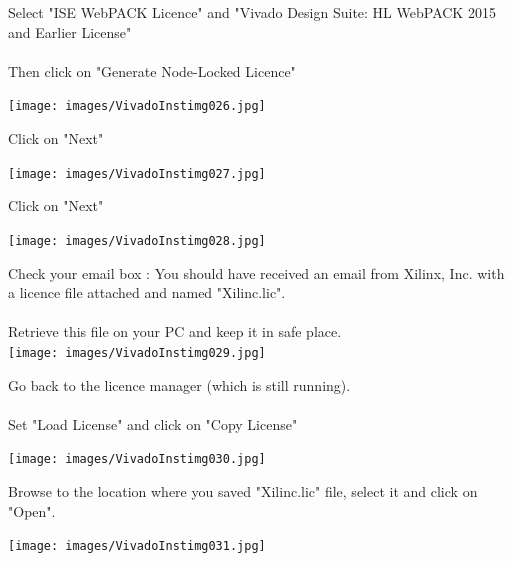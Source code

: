 \begin{minipage}{\linewidth}
Select "ISE WebPACK Licence" and "Vivado Design Suite: HL WebPACK 2015 and Earlier License" \\
\\
Then click on "Generate Node-Locked Licence"
\\
\begin{center}
  \texttt{[image: images/VivadoInstimg026.jpg]}
\end{center}
\end{minipage}

\begin{minipage}{\linewidth}
  Click on "Next"
  \\
  \begin{center}
    \texttt{[image: images/VivadoInstimg027.jpg]}
  \end{center}
\end{minipage}

\begin{minipage}{\linewidth}
  Click on "Next"
  \\
  \begin{center}
    \texttt{[image: images/VivadoInstimg028.jpg]}
  \end{center}
\end{minipage}


\begin{minipage}{\linewidth}
  Check your email box : You should have received an email from Xilinx, Inc. with a licence file attached and named "Xilinc.lic". \\
  \\
  Retrieve this file on your PC and keep it in safe place.
  \\
  \texttt{[image: images/VivadoInstimg029.jpg]}
\end{minipage}

\begin{minipage}{\linewidth}
  Go back to the licence manager (which is still running). \\
  \\
  Set "Load License" and click on "Copy License"
  \\
  \begin{center}
    \texttt{[image: images/VivadoInstimg030.jpg]}
  \end{center}
\end{minipage}

\begin{minipage}{\linewidth}
  Browse to the location where you saved "Xilinc.lic" file, select it and click on "Open".
  \\
  \begin{center}
    \texttt{[image: images/VivadoInstimg031.jpg]}
  \end{center}
\end{minipage}

